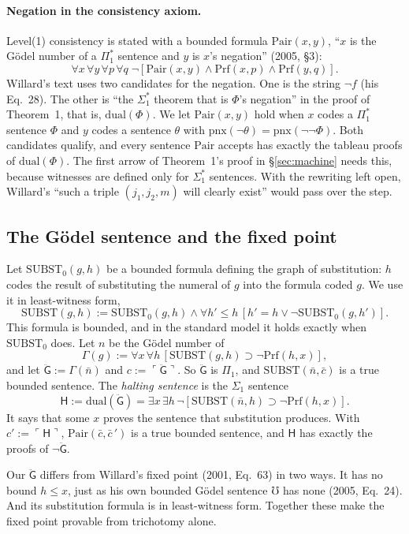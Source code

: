 \documentclass[11pt]{article}
\newcommand{\G}{\ddot{\mathsf{G}}}          %
\newcommand{\Hs}{\mathsf{H}}                %
\newcommand{\Prf}{\mathrm{Prf}}
\newcommand{\Subst}{\mathrm{SUBST}}
\newcommand{\Pair}{\mathrm{Pair}}
\newcommand{\gn}[1]{\ulcorner #1\urcorner}  %
\newcommand{\Mho}{\mho}                     %
\theoremstyle{plain}
\theoremstyle{definition}
\begin{document}
\paragraph{Negation in the consistency axiom.} Level(1) consistency is
stated with a bounded formula $\Pair(x,y)$, ``$x$ is the Gödel number of a
$\Pi_1^*$ sentence and $y$ is $x$'s negation'' (2005, \S3):
\[
\forall x\,\forall y\,\forall p\,\forall q\;\neg[\Pair(x,y) \wedge \Prf(x,p)
\wedge \Prf(y,q)].
\]
Willard's text uses two candidates for the negation. One is the string
$\neg f$ (his Eq.~28). The other is ``the $\Sigma_1^*$ theorem that is $\Phi$'s
negation'' in the proof of Theorem~1, that is, $\mathrm{dual}(\Phi)$. We let
$\Pair(x,y)$ hold when $x$ codes a $\Pi_1^*$ sentence $\Phi$ and $y$ codes a
sentence $\theta$ with $\mathrm{pnx}(\neg\theta) = \mathrm{pnx}(\neg\neg\Phi)$.
Both candidates qualify, and every sentence $\Pair$ accepts has exactly the
tableau proofs of $\mathrm{dual}(\Phi)$. The first arrow of Theorem~1's proof
in \S\ref{sec:machine} needs this, because witnesses are defined only for
$\Sigma_1^*$ sentences. With the rewriting left open, Willard's ``such a
triple $(j_1, j_2, m)$ will clearly exist'' would pass over the step.

\subsection{The Gödel sentence and the fixed point}

Let $\Subst_0(g,h)$ be a bounded formula defining the graph of substitution:
$h$ codes the result of substituting the numeral of $g$ into the formula
coded $g$. We use it in least-witness form,
\[
\Subst(g,h) := \Subst_0(g,h) \wedge \forall h' \le h\,[h' = h \vee
\neg\Subst_0(g,h')].
\]
This formula is bounded, and in the standard model it holds exactly when
$\Subst_0$ does. Let $n$ be the Gödel number of
\[
\Gamma(g) := \forall x\,\forall h\,[\Subst(g,h) \supset \neg\Prf(h,x)],
\]
and let $\G := \Gamma(\bar n)$ and $c := \gn{\G}$. So $\G$ is $\Pi_1$, and
$\Subst(\bar n, \bar c)$ is a true bounded sentence. The \emph{halting
sentence} is the $\Sigma_1$ sentence
\[
\Hs := \mathrm{dual}(\G) = \exists x\,\exists h\,\neg[\Subst(\bar n,h)
\supset \neg\Prf(h,x)].
\]
It says that some $x$ proves the sentence that substitution produces. With
$c' := \gn{\Hs}$, $\Pair(\bar c, \bar c\,')$ is a true bounded sentence, and
$\Hs$ has exactly the proofs of $\neg\G$.

Our $\G$ differs from Willard's fixed point (2001, Eq.~63) in two ways. It has
no bound $h \le x$, just as his own bounded Gödel sentence $\Mho$ has none
(2005, Eq.~24). And its substitution formula is in least-witness form.
Together these make the fixed point provable from trichotomy alone.
\end{document}
